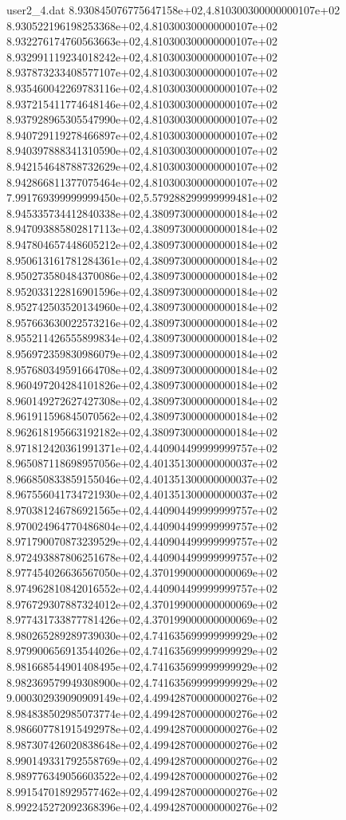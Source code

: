 \begin{filecontents}{user2_4.dat}
8.930845076775647158e+02,4.810300300000000107e+02
8.930522196198253368e+02,4.810300300000000107e+02
8.932276174760563663e+02,4.810300300000000107e+02
8.932991119234018242e+02,4.810300300000000107e+02
8.937873233408577107e+02,4.810300300000000107e+02
8.935460042269783116e+02,4.810300300000000107e+02
8.937215411774648146e+02,4.810300300000000107e+02
8.937928965305547990e+02,4.810300300000000107e+02
8.940729119278466897e+02,4.810300300000000107e+02
8.940397888341310590e+02,4.810300300000000107e+02
8.942154648788732629e+02,4.810300300000000107e+02
8.942866811377075464e+02,4.810300300000000107e+02
7.991769399999999450e+02,5.579288299999999481e+02
8.945335734412840338e+02,4.380973000000000184e+02
8.947093885802817113e+02,4.380973000000000184e+02
8.947804657448605212e+02,4.380973000000000184e+02
8.950613161781284361e+02,4.380973000000000184e+02
8.950273580484370086e+02,4.380973000000000184e+02
8.952033122816901596e+02,4.380973000000000184e+02
8.952742503520134960e+02,4.380973000000000184e+02
8.957663630022573216e+02,4.380973000000000184e+02
8.955211426555899834e+02,4.380973000000000184e+02
8.956972359830986079e+02,4.380973000000000184e+02
8.957680349591664708e+02,4.380973000000000184e+02
8.960497204284101826e+02,4.380973000000000184e+02
8.960149272627427308e+02,4.380973000000000184e+02
8.961911596845070562e+02,4.380973000000000184e+02
8.962618195663192182e+02,4.380973000000000184e+02
8.971812420361991371e+02,4.440904499999999757e+02
8.965087118698957056e+02,4.401351300000000037e+02
8.966850833859155046e+02,4.401351300000000037e+02
8.967556041734721930e+02,4.401351300000000037e+02
8.970381246786921565e+02,4.440904499999999757e+02
8.970024964770486804e+02,4.440904499999999757e+02
8.971790070873239529e+02,4.440904499999999757e+02
8.972493887806251678e+02,4.440904499999999757e+02
8.977454026636567050e+02,4.370199000000000069e+02
8.974962810842016552e+02,4.440904499999999757e+02
8.976729307887324012e+02,4.370199000000000069e+02
8.977431733877781426e+02,4.370199000000000069e+02
8.980265289289739030e+02,4.741635699999999929e+02
8.979900656913544026e+02,4.741635699999999929e+02
8.981668544901408495e+02,4.741635699999999929e+02
8.982369579949308900e+02,4.741635699999999929e+02
9.000302939090909149e+02,4.499428700000000276e+02
8.984838502985073774e+02,4.499428700000000276e+02
8.986607781915492978e+02,4.499428700000000276e+02
8.987307426020838648e+02,4.499428700000000276e+02
8.990149331792558769e+02,4.499428700000000276e+02
8.989776349056603522e+02,4.499428700000000276e+02
8.991547018929577462e+02,4.499428700000000276e+02
8.992245272092368396e+02,4.499428700000000276e+02

\end{filecontents}
